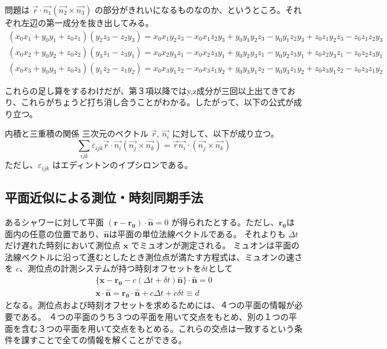 問題は $\overrightarrow{r} \cdot \overrightarrow{n_1} ( \overrightarrow{n_2} \times \overrightarrow{n_3} ) $ の部分がきれいになるものなのか、というところ。それぞれ左辺の第一成分を抜き出してみる。
\begin{eqnarray}
    (x_0 x_1 + y_0 y_1 + z_0 z_1) (y_2 z_3 - z_2 y_3) = x_0 x_1 y_2 z_3 - x_0 x_1 z_2 y_3 + y_0 y_1 y_2 z_3 - y_0 y_1 z_2 y_3 + z_0 z_1 y_2 z_3 - z_0 z_1 z_2 y_3 \\
    (x_0 x_2 + y_0 y_2 + z_0 z_2) (y_3 z_1 - z_3 y_1) = x_0 x_2 y_3 z_1 - x_0 x_2 z_3 y_1 + y_0 y_2 y_3 z_1 - y_0 y_2 z_3 y_1 + z_0 z_2 y_3 z_1 - z_0 z_2 z_3 y_1 \\
    (x_0 x_3 + y_0 y_3 + z_0 z_3) (y_1 z_2 - z_1 y_2) = x_0 x_3 y_1 z_2 - x_0 x_3 z_1 y_2 + y_0 y_3 y_1 z_2 - y_0 y_3 z_1 y_2 + z_0 z_3 y_1 z_2 - z_0 z_3 z_1 y_2 
\end{eqnarray}

これらの足し算をするわけだが、第３項以降ではy,z成分が三回以上出てきており、これらがちょうど打ち消し合うことがわかる。したがって、以下の公式が成り立つ。

\begin{qbox}{内積と三重積の関係}
    三次元のベクトル $\overrightarrow{r}$, $\overrightarrow{n_i}$ に対して、以下が成り立つ。
    \begin{equation}
        \sum_{ijk} \varepsilon_{ijk} \overrightarrow{r}\cdot \overrightarrow{n_i} (\overrightarrow{n_j}\times\overrightarrow{n_k}) = \overrightarrow{r} \overrightarrow{n_i} \cdot (\overrightarrow{n_j}\times\overrightarrow{n_k})
    \end{equation}
    ただし、$\varepsilon_{ijk}$ はエディントンのイプシロンである。
\end{qbox}

\subsection{平面近似による測位・時刻同期手法}

あるシャワーに対して平面 $(\bm{r} - \bm{r_0})\cdot \bm{\hat{n}} = 0$ が得られたとする。ただし、$\bm{r_0}$は面内の任意の位置であり、$\bm{\hat{n}}$は平面の単位法線ベクトルである。
それよりも $\Delta t$ だけ遅れた時刻において測位点 $\bm{x}$ でミュオンが測定される。
ミュオンは平面の法線ベクトルに沿って進むとしたとき測位点が満たす方程式は、ミュオンの速さを $c$、測位点の計測システムが持つ時刻オフセットを$\delta t$として
\begin{eqnarray}
    \{\bm{x} - \bm{r_0} -c(\Delta t + \delta t)\bm{\hat{n}}\} \cdot \bm{\hat{n}} = 0  \\
    \bm{x}\cdot\bm{\hat{n}} = \bm{r_0}\cdot\bm{\hat{n}} + c\Delta t + c\delta t \equiv d  
\end{eqnarray}
となる。測位点および時刻オフセットを求めるためには、４つの平面の情報が必要である。
４つの平面のうち３つの平面を用いて交点をもとめ、別の１つの平面を含む３つの平面を用いて交点をもとめる。これらの交点は一致するという条件を課すことで全ての情報を解くことができる。